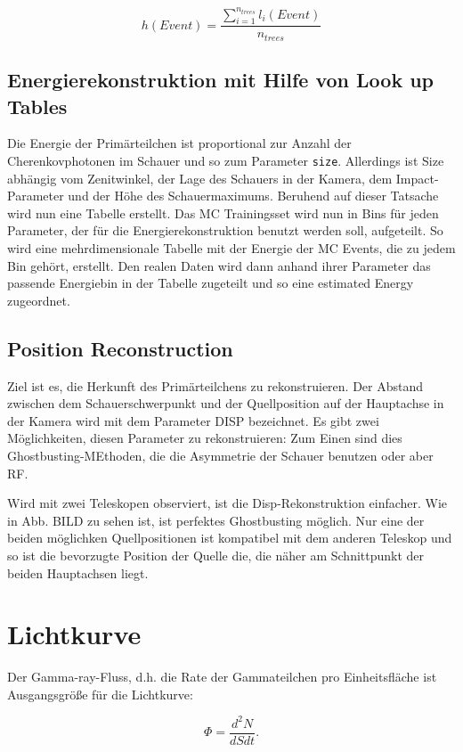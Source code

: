 \begin{equation}
 h(Event)=\frac{ \sum_{i=1} ^{n_{trees}} l_i(Event)}{n_{trees}}
\end{equation}



\subsection{Energierekonstruktion mit Hilfe von Look up Tables}
Die Energie der Primärteilchen ist proportional zur Anzahl der Cherenkovphotonen im Schauer und so zum Parameter \texttt{size}.
Allerdings ist Size abhängig vom Zenitwinkel, der Lage des Schauers in der Kamera, dem Impact-Parameter und der Höhe des Schauermaximums.
Beruhend auf dieser Tatsache wird nun eine Tabelle erstellt.
Das MC Trainingsset wird nun in Bins für jeden Parameter, der für die Energierekonstruktion benutzt werden soll, aufgeteilt.
So wird eine mehrdimensionale Tabelle mit der Energie der MC Events, die zu jedem Bin gehört, erstellt.
Den realen Daten wird dann anhand ihrer Parameter das passende Energiebin in der Tabelle zugeteilt und so eine estimated Energy zugeordnet.


\subsection{Position Reconstruction}
Ziel ist es, die Herkunft des Primärteilchens zu rekonstruieren. 
Der Abstand zwischen dem Schauerschwerpunkt und der Quellposition auf der Hauptachse in der Kamera wird mit dem Parameter DISP bezeichnet.
Es gibt zwei Möglichkeiten, diesen Parameter zu rekonstruieren: Zum Einen sind dies Ghostbusting-MEthoden, die die Asymmetrie der Schauer benutzen oder aber RF.

Wird mit zwei Teleskopen observiert, ist die Disp-Rekonstruktion einfacher.
Wie in Abb. BILD zu sehen ist, ist perfektes Ghostbusting möglich.
Nur eine der beiden möglichken Quellpositionen ist kompatibel mit dem anderen Teleskop und so ist die bevorzugte Position der Quelle die, die näher am Schnittpunkt der beiden Hauptachsen liegt.



\section{Lichtkurve}
Der Gamma-ray-Fluss, d.h. die Rate der  Gammateilchen pro Einheitsfläche ist Ausgangsgröße für die Lichtkurve:

\begin{equation}
 \Phi=\frac{d^2 N}{dS dt}. 
\end{equation}


